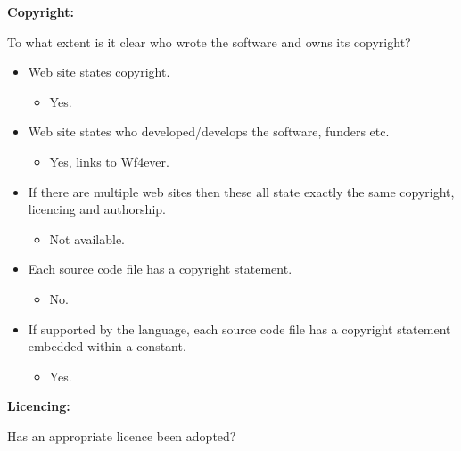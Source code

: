 \textbf{Copyright:}

To what extent is it clear who wrote the software and owns its
copyright?

\begin{itemize}
\itemsep1pt\parskip0pt
\item
  Web site states copyright.

  \begin{itemize}
  \itemsep1pt\parskip0pt
  \item
    Yes.
  \end{itemize}
\item
  Web site states who developed/develops the software, funders etc.

  \begin{itemize}
  \itemsep1pt\parskip0pt
  \item
    Yes, links to Wf4ever.
  \end{itemize}
\item
  If there are multiple web sites then these all state exactly the same
  copyright, licencing and authorship.

  \begin{itemize}
  \itemsep1pt\parskip0pt
  \item
    Not available.
  \end{itemize}
\item
  Each source code file has a copyright statement.

  \begin{itemize}
  \itemsep1pt\parskip0pt
  \item
    No.
  \end{itemize}
\item
  If supported by the language, each source code file has a copyright
  statement embedded within a constant.

  \begin{itemize}
  \itemsep1pt\parskip0pt
  \item
    Yes.
  \end{itemize}
\end{itemize}

\textbf{Licencing:}

Has an appropriate licence been adopted?

